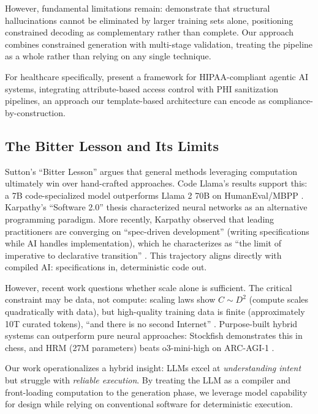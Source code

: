 \documentclass[11pt]{article}
\begin{document}
However, fundamental limitations remain: \citet{xu2024hallucination} demonstrate that structural hallucinations cannot be eliminated by larger training sets alone, positioning constrained decoding as complementary rather than complete. Our approach combines constrained generation with multi-stage validation, treating the pipeline as a whole rather than relying on any single technique.

For healthcare specifically, \citet{neupane2025hipaa} present a framework for HIPAA-compliant agentic AI systems, integrating attribute-based access control with PHI sanitization pipelines, an approach our template-based architecture can encode as compliance-by-construction.

\subsection{The Bitter Lesson and Its Limits}

Sutton's ``Bitter Lesson'' \citep{sutton2019bitter} argues that general methods leveraging computation ultimately win over hand-crafted approaches. Code Llama's results support this: a 7B code-specialized model outperforms Llama 2 70B on HumanEval/MBPP \citep{roziere2023codellama}. Karpathy's ``Software 2.0'' thesis \citep{karpathy2017software2} characterized neural networks as an alternative programming paradigm. More recently, Karpathy observed that leading practitioners are converging on ``spec-driven development'' (writing specifications while AI handles implementation), which he characterizes as ``the limit of imperative to declarative transition'' \citep{karpathy2026specdriven}. This trajectory aligns directly with compiled AI: specifications in, deterministic code out.

However, recent work questions whether scale alone is sufficient. The critical constraint may be data, not compute: scaling laws show $C \sim D^2$ (compute scales quadratically with data), but high-quality training data is finite (approximately 10T curated tokens), ``and there is no second Internet'' \citep{chakrabarti2025bitter}. Purpose-built hybrid systems can outperform pure neural approaches: Stockfish demonstrates this in chess, and HRM (27M parameters) beats o3-mini-high on ARC-AGI-1 \citep{breunig2025bitter}.

Our work operationalizes a hybrid insight: LLMs excel at \emph{understanding intent} but struggle with \emph{reliable execution}. By treating the LLM as a compiler and front-loading computation to the generation phase, we leverage model capability for design while relying on conventional software for deterministic execution.
\end{document}
